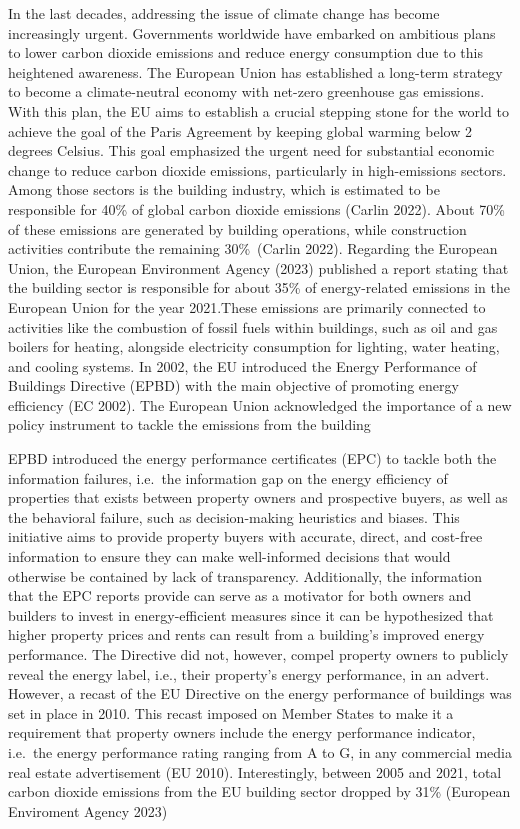 \documentclass[
  letterpaper,
  DIV=11,
  numbers=noendperiod]{scrreprt}
\begin{document}
In the last decades, addressing the issue of climate change has become
increasingly urgent. Governments worldwide have embarked on ambitious
plans to lower carbon dioxide emissions and reduce energy consumption
due to this heightened awareness. The European Union has established a
long-term strategy to become a climate-neutral economy with net-zero
greenhouse gas emissions. With this plan, the EU aims to establish a
crucial stepping stone for the world to achieve the goal of the Paris
Agreement by keeping global warming below 2 degrees Celsius. This goal
emphasized the urgent need for substantial economic change to reduce
carbon dioxide emissions, particularly in high-emissions sectors. Among
those sectors is the building industry, which is estimated to be
responsible for 40\% of global carbon dioxide emissions (Carlin 2022).
About 70\% of these emissions are generated by building operations,
while construction activities contribute the remaining 30\%~(Carlin
2022). Regarding the European Union, the European Environment Agency
(2023) published a report stating that the building sector is
responsible for about 35\% of energy-related emissions in the European
Union for the year 2021.These emissions are primarily connected to
activities like the combustion of fossil fuels within buildings, such as
oil and gas boilers for heating, alongside electricity consumption for
lighting, water heating, and cooling systems. In 2002, the EU introduced
the Energy Performance of Buildings Directive (EPBD) with the main
objective of promoting energy efficiency (EC 2002). The European Union
acknowledged the importance of a new policy instrument to tackle the
emissions from the building

EPBD introduced the energy performance certificates (EPC) to tackle both
the information failures, i.e.~the information gap on the energy
efficiency of properties that exists between property owners and
prospective buyers, as well as the behavioral failure, such as
decision-making heuristics and biases. This initiative aims to provide
property buyers with accurate, direct, and cost-free information to
ensure they can make well-informed decisions that would otherwise be
contained by lack of transparency. Additionally, the information that
the EPC reports provide can serve as a motivator for both owners and
builders to invest in energy-efficient measures since it can be
hypothesized that higher property prices and rents can result from a
building's improved energy performance. The Directive did not, however,
compel property owners to publicly reveal the energy label, i.e., their
property's energy performance, in an advert. However, a recast of the EU
Directive on the energy performance of buildings was set in place in
2010. This recast imposed on Member States to make it a requirement that
property owners include the energy performance indicator, i.e.~the
energy performance rating ranging from A to G, in any commercial media
real estate advertisement (EU 2010). Interestingly, between 2005 and
2021, total carbon dioxide emissions from the EU building sector dropped
by 31\% (European Enviroment Agency 2023)
\end{document}
